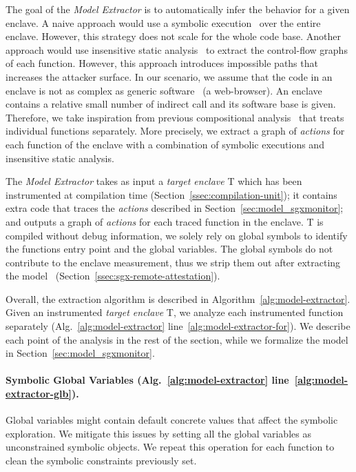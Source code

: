 The goal of the \emph{Model Extractor} is to automatically infer the 
behavior for a given enclave. A naive approach would use a symbolic 
execution~\citep{king1976symbolic} over the entire enclave.
However, this strategy does not scale for the whole code base.
Another approach would use insensitive static 
analysis~\citep{coppa2017rethinking} to extract the control-flow graphs of each 
function. However, this approach introduces impossible paths that increases the 
attacker surface.
In our scenario, we assume that the code in an enclave is not as 
complex as generic software~\citep{abadi2009control} (\eg a web-browser).
An enclave contains a relative small number of indirect call and its 
software base is given.
Therefore, we take inspiration from previous compositional 
analysis~\citep{calcagno2009compositional} that treats individual functions 
separately.
More precisely, we extract a graph of \emph{actions} for each function of the 
enclave with a combination of symbolic executions and insensitive static 
analysis.

The \emph{Model Extractor} takes as input a \emph{target enclave} T which has 
been instrumented at compilation time (Section~\ref{ssec:compilation-unit});
\ie it contains extra code that traces the \emph{actions} described in 
Section~\ref{sec:model_sgxmonitor}; and outputs a graph of \emph{actions} for 
each traced 
function in the enclave.
T is compiled without debug information, we solely rely on global symbols to 
identify the functions entry point and the global variables.
The global symbols do not contribute to the enclave measurement, thus we strip 
them out after extracting the model~\citep{intel2} 
(Section~\ref{ssec:sgx-remote-attestation}). 

Overall, the extraction algorithm is described in 
Algorithm~\ref{alg:model-extractor}. Given an instrumented \emph{target 
	enclave} T, we analyze each instrumented function separately 
(Alg.~\ref{alg:model-extractor} line~\ref{alg:model-extractor-for}).
We describe each point of the analysis in the rest of the section, while we 
formalize the model in Section~\ref{sec:model_sgxmonitor}.

\paragraph{Symbolic Global Variables (Alg.~\ref{alg:model-extractor} 
	line~\ref{alg:model-extractor-glb}).} 
Global variables might contain default concrete values that affect the symbolic 
exploration.
We mitigate this issues by setting all the global variables as unconstrained
symbolic objects. 
We repeat this operation for each function to clean the symbolic constraints 
previously set. 


